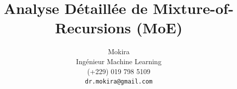 \documentclass[a4paper]{article}
\title{Analyse Détaillée de Mixture-of-Recursions (MoE)}
\author{
 Mokira \\
  Ingénieur Machine Learning \\
  (+229) 019 798 5109 \\
  \texttt{dr.mokira@gmail.com} \\
}
\begin{document}
\maketitle

\begin{abstract}



\end{abstract}
\end{document}
